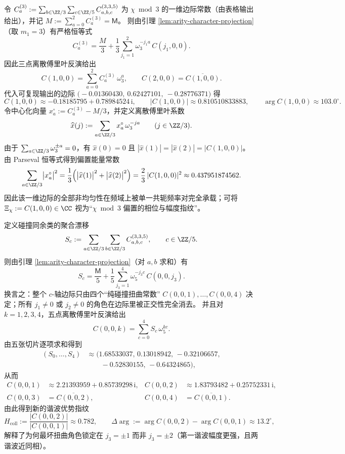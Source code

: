 \begin{corollary}\label{cor:arity-335-marginal-invert-chi}
令 \(C^{(3)}_a:=\sum_{b\in\ZZ/3}\sum_{c\in\ZZ/5}C^{(3,3,5)}_{a,b,c}\) 为 \(\chi\bmod 3\) 的一维边际常数（由表格输出给出），并记 \(M:=\sum_{a=0}^2 C^{(3)}_a=\mathsf{M}\)。
则由引理 \ref{lem:arity-character-projection}（取 \(m_1=3\)）有严格恒等式
\[
C^{(3)}_a=\frac{M}{3}+\frac13\sum_{j_1=1}^{2}\omega_3^{-j_1a}\,C(j_1,0,0).
\]
因此三点离散傅里叶反演给出
\[
C(1,0,0)=\sum_{a=0}^{2}C^{(3)}_a\,\omega_3^{a},\qquad
C(2,0,0)=\overline{C(1,0,0)}.
\]
代入可复现输出的边际 \(\bigl(-0.01360430,\ 0.62427101,\ -0.28776371\bigr)\) 得
\[
C(1,0,0)\approx -0.18185795+0.78984524\,\mathrm{i},
\qquad
|C(1,0,0)|\approx 0.810510833883,
\qquad
\arg C(1,0,0)\approx 103.0^\circ.
\]
令中心化向量 \(x_a^\circ:=C^{(3)}_a-M/3\)，并定义离散傅里叶系数
\[
\widehat x(j):=\sum_{a\in\ZZ/3}x_a^\circ\,\omega_3^{-ja}\qquad(j\in\ZZ/3).
\]
由于 \(\sum_{a\in\ZZ/3}\omega_3^{\pm a}=0\)，有 \(\widehat x(0)=0\) 且 \(|\widehat x(1)|=|\widehat x(2)|=|C(1,0,0)|\)。
由 Parseval 恒等式得到偏置能量常数
\[
\sum_{a\in\ZZ/3}\bigl|x_a^\circ\bigr|^2
=\frac13\Bigl(\bigl|\widehat x(1)\bigr|^2+\bigl|\widehat x(2)\bigr|^2\Bigr)
=\frac23\,|C(1,0,0)|^2
\approx 0.437951874562.
\]
因此该一维边际的全部非均匀性在频域上被单一共轭频率对完全承载；可将 \(\Xi_\chi:=C(1,0,0)\in\CC\) 视为“\(\chi\bmod 3\) 偏置的相位与幅度指纹”。
\end{corollary}

\begin{corollary}\label{cor:arity-335-marginal-invert-collision}
定义碰撞同余类的聚合漂移
\[
S_c:=\sum_{a\in\ZZ/3}\sum_{b\in\ZZ/3}C^{(3,3,5)}_{a,b,c},
\qquad c\in\ZZ/5.
\]
则由引理 \ref{lem:arity-character-projection}（对 \(a,b\) 求和）有
\[
S_c=\frac{\mathsf{M}}{5}+\frac15\sum_{j_3=1}^{4}\omega_5^{-j_3c}\,C(0,0,j_3).
\]
换言之：整个 \(c\)-轴边际只由四个“纯碰撞扭曲常数” \(C(0,0,1),\dots,C(0,0,4)\) 决定；所有 \(j_1\ne0\) 或 \(j_2\ne0\) 的角色在边际里被正交性完全消去。
并且对 \(k=1,2,3,4\)，五点离散傅里叶反演给出
\[
C(0,0,k)=\sum_{c=0}^{4}S_c\,\omega_5^{kc}.
\]
由五张切片逐项求和得到
\[
\begin{aligned}
(S_0,\dots,S_4)
&\approx(1.68533037,\,0.13018942,\,-0.32106657,\\
&\qquad -0.52830155,\,-0.64324865),
\end{aligned}
\]
从而
\[
\begin{aligned}
C(0,0,1)&\approx 2.21393959+0.85739298\,\mathrm{i},&
C(0,0,2)&\approx 1.83793482+0.25752331\,\mathrm{i},\\
C(0,0,3)&=\overline{C(0,0,2)},&
C(0,0,4)&=\overline{C(0,0,1)}.
\end{aligned}
\]
由此得到新的谐波优势指纹
\[
H_{\mathrm{coll}}:=\frac{|C(0,0,2)|}{|C(0,0,1)|}\approx 0.782,
\qquad
\Delta\arg:=\arg C(0,0,2)-\arg C(0,0,1)\approx 13.2^\circ,
\]
解释了为何最坏扭曲角色锁定在 \(j_3=\pm1\) 而非 \(j_3=\pm2\)（第一谐波幅度更强，且两谐波近同相）。
\end{corollary}


